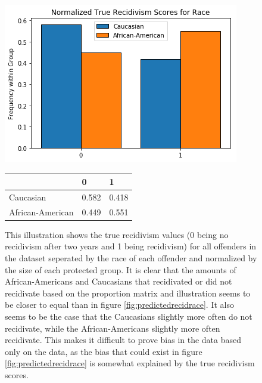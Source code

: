 \documentclass[11pt, fleqn, titlepage]{article}
\begin{document}
	
	\begin{figure}[H]
		\centering
		\includegraphics[width=0.5\linewidth]{imgs/true_normalized_race}
		\begin{table}[H]
			\centering
			\begin{tabular}{|l|l|l|}
				\hline
				& 0   & 1  \\ \hline
				Caucasian        & 0.582 & 0.418  \\ \hline
				African-American & 0.449 & 0.551  \\ \hline
			\end{tabular}
		\end{table}
		\caption{This illustration shows the true recidivism values (0 being no recidivism after two years and 1 being recidivism) for all offenders in the dataset seperated by the race of each offender and normalized by the size of each protected group. It is clear that the amounts of African-Americans and Caucasians that recidivated or did not recidivate based on the proportion matrix and illustration seems to be closer to equal than in figure \ref{fig:predictedrecidrace}. It also seems to be the case that the Caucasians slightly more often do not recidivate, while the African-Americans slightly more often recidivate. This makes it difficult to prove bias in the data based only on the data, as the bias that could exist in figure \ref{fig:predictedrecidrace} is somewhat explained by the true recidivism scores.}
		\label{fig:truerecid}
	\end{figure}
	
\end{document}
